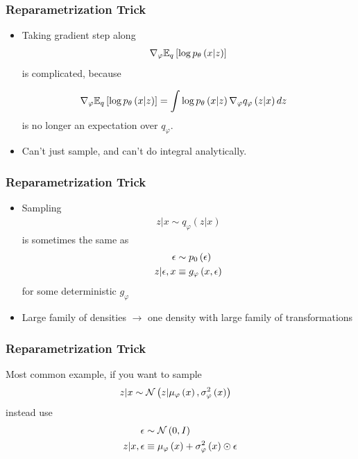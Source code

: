 \documentclass[10pt,mathserif]{beamer}
\begin{document}
\begin{frame}
  \frametitle{Reparametrization Trick}
  \begin{itemize}
  \item Taking gradient step along
  \begin{align*}
    \nabla_{\varphi} \mathbb{E}_{q}\left[{\log p_{\theta}\left(x \vert z\right)}\right]
  \end{align*}
  is complicated, because

  \begin{align*}
    \nabla_{\varphi} \mathbb{E}_{q}\left[{\log p_{\theta}\left(x \vert z\right)}\right] &= \int \log p_{\theta}\left(x \vert z\right)
    \nabla_{\varphi}q_{\varphi}\left(z \vert x\right)dz
  \end{align*}
  is no longer an expectation over $q_{\varphi}$.
  \item Can't just sample, and can't do integral analytically.
  \end{itemize}
\end{frame}

\begin{frame}
  \frametitle{Reparametrization Trick}
  \begin{itemize}
  \item Sampling
  \begin{align*}
    z \vert x \sim q_{\varphi}\left(z \vert x\right)
  \end{align*}
  is sometimes the same as
  \begin{align*}
    \epsilon &\sim p_{0}\left(\epsilon\right) \\
    z \vert \epsilon, x &\equiv g_{\varphi}\left(x, \epsilon\right)
  \end{align*}
  for some deterministic $g_{\varphi}$
  \item Large family of densities $\rightarrow$ one density with large family of
    transformations
  \end{itemize}
\end{frame}

\begin{frame}
  \frametitle{Reparametrization Trick}
  Most common example, if you want to sample
  \begin{align*}
    z \vert x &\sim \mathcal{N}\left(z \vert \mu_{\varphi}\left(x\right), \sigma_{\varphi}^{2}\left(x\right)\right)
  \end{align*}
  instead use
  \begin{align*}
    \epsilon &\sim \mathcal{N}\left(0, I\right) \\
    z \vert x, \epsilon &\equiv \mu_{\varphi}\left(x\right) + \sigma_{\varphi}^{2}\left(x\right) \odot \epsilon
  \end{align*}
\end{frame}
\end{document}
